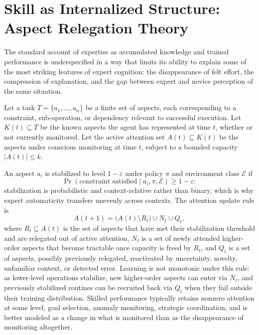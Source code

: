 \section{Skill as Internalized Structure: Aspect Relegation Theory}

The standard account of expertise as accumulated knowledge and trained performance is underspecified in a way that limits its ability to explain some of the most striking features of expert cognition: the disappearance of felt effort, the compression of explanation, and the gap between expert and novice perception of the same situation.

\begin{definition}
Let a task $T = \{a_1,\ldots,a_n\}$ be a finite set of aspects, each corresponding to a constraint, sub-operation, or dependency relevant to successful execution. Let $K(t) \subseteq T$ be the known aspects the agent has represented at time $t$, whether or not currently monitored. Let the active attention set $A(t) \subseteq K(t)$ be the aspects under conscious monitoring at time $t$, subject to a bounded capacity $|A(t)| \leq k$.
\end{definition}

An aspect $a_i$ is stabilized to level $1-\varepsilon$ under policy $\pi$ and environment class $\mathcal{E}$ if
\[
\Pr(\text{constraint satisfied} \mid a_i,\pi,\mathcal{E}) \geq 1-\varepsilon:
\]
stabilization is probabilistic and context-relative rather than binary, which is why expert automaticity transfers unevenly across contexts. The attention update rule is
\[
A(t+1) = \bigl(A(t) \setminus R_t\bigr) \cup N_t \cup Q_t,
\]
where $R_t \subseteq A(t)$ is the set of aspects that have met their stabilization threshold and are relegated out of active attention, $N_t$ is a set of newly attended higher-order aspects that become tractable once capacity is freed by $R_t$, and $Q_t$ is a set of aspects, possibly previously relegated, reactivated by uncertainty, novelty, unfamiliar context, or detected error. Learning is not monotonic under this rule: as lower-level operations stabilize, new higher-order aspects can enter via $N_t$, and previously stabilized routines can be recruited back via $Q_t$ when they fail outside their training distribution. Skilled performance typically retains nonzero attention at some level, goal selection, anomaly monitoring, strategic coordination, and is better modeled as a change in what is monitored than as the disappearance of monitoring altogether.

